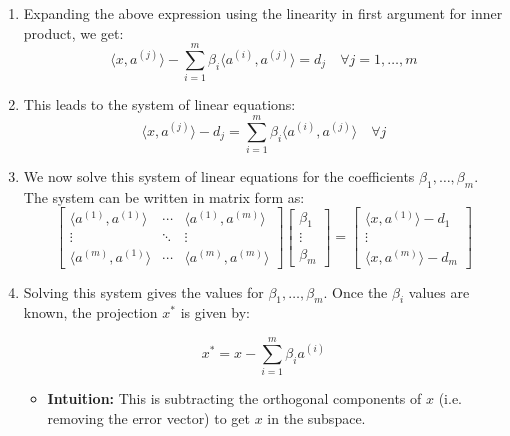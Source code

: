 \begin{derivation}
\begin{enumerate}
        \item Expanding the above expression using the linearity in first argument for inner product, we get:
        \[
        \langle x, a^{(j)} \rangle - \sum_{i=1}^{m} \beta_i \langle a^{(i)}, a^{(j)} \rangle = d_j \quad \forall j = 1, \dots, m
        \]
        
        \item This leads to the system of linear equations:
        \[
        \langle x, a^{(j)} \rangle - d_j = \sum_{i=1}^{m} \beta_i \langle a^{(i)}, a^{(j)} \rangle \quad \forall j
        \]
        
        \item We now solve this system of linear equations for the coefficients $\beta_1, \dots, \beta_m$. The system can be written in matrix form as:
        \[
        \begin{bmatrix}
        \langle a^{(1)}, a^{(1)} \rangle & \cdots & \langle a^{(1)}, a^{(m)} \rangle \\
        \vdots & \ddots & \vdots \\
        \langle a^{(m)}, a^{(1)} \rangle & \cdots & \langle a^{(m)}, a^{(m)} \rangle
        \end{bmatrix}
        \begin{bmatrix}
        \beta_1 \\
        \vdots \\
        \beta_m
        \end{bmatrix}
        =
        \begin{bmatrix}
        \langle x, a^{(1)} \rangle - d_1 \\
        \vdots \\
        \langle x, a^{(m)} \rangle - d_m
        \end{bmatrix}
        \]
        
        \item Solving this system gives the values for $\beta_1, \dots, \beta_m$. Once the $\beta_i$ values are known, the projection $x^*$ is given by:
        
        \[
        x^* = x - \sum_{i=1}^{m} \beta_i a^{(i)} 
        \]
        \begin{itemize}
            \item \textbf{Intuition:} This is subtracting the orthogonal components of $x$ (i.e. removing the error vector) to get $x$ in the subspace.
        \end{itemize}
    \end{enumerate}            
\end{derivation}

